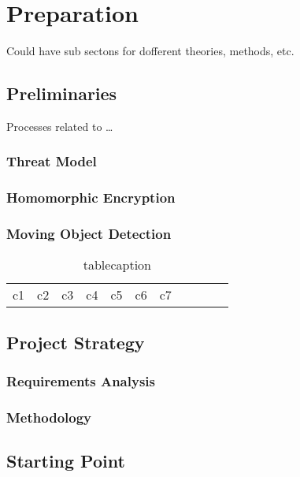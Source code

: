 \chapter{Preparation}
\label{chap:preparation}

Could have sub sectons for dofferent theories, methods, etc. 

\section{Preliminaries}
Processes related to \ldots
\subsection{Threat Model}

\subsection{Homomorphic Encryption}

\subsection{Moving Object Detection}

\begin{table}[!htbp]\centering
\def\arraystretch{1.3}
\caption{tablecaption}
\vspace{5pt}
    \small
\setlength{\tabcolsep}{4pt}
\begin{tabular}{lcrccccccll}
\hline
 c1 & c2 & c3 & c4 & c5 & c6 & c7 \\
\end{tabular}
\label{Tab:1}
\end{table}
\normalsize


\section{Project Strategy}

\subsection{Requirements Analysis}

\subsection{Methodology}


\section{Starting Point}

